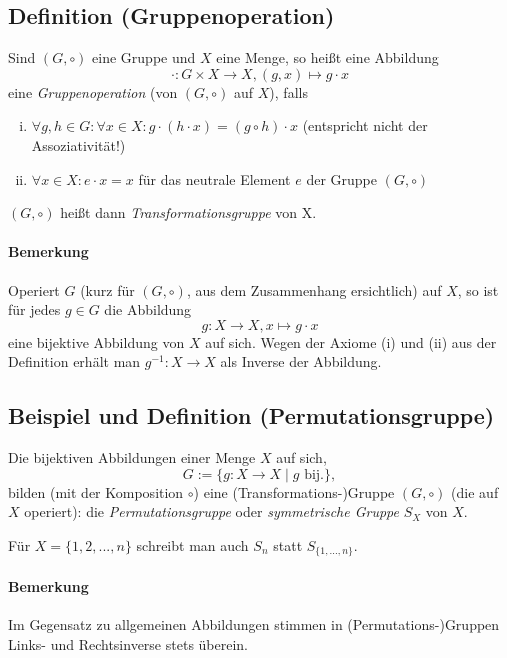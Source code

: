 \subsection{Definition (Gruppenoperation)}
	\begin{Definition}[Gruppenoperation]
		Sind $(G,\circ )$ eine Gruppe und $X$ eine Menge, so heißt eine Abbildung
		\[ \cdot : G\times X\to X, (g,x)\mapsto g\cdot x \]
	eine \emph{Gruppenoperation} (von $(G,\circ )$ auf $X$), falls
	\begin{enumerate}[(i)]
		\item $\forall g,h\in G :\forall x\in X: g\cdot (h\cdot x) = (g\circ h)\cdot x$ (entspricht nicht der Assoziativität!)
		\item $\forall x\in X: e\cdot x = x$ für das neutrale Element $e$ der Gruppe $(G,\circ )$
	\end{enumerate}
	$(G,\circ )$ heißt dann \emph{Transformationsgruppe} von X.
	\end{Definition}

\paragraph{Bemerkung}
	Operiert $G$ (kurz für $(G,\circ )$, aus dem Zusammenhang ersichtlich) auf $X$, so ist für jedes $g\in G$ die Abbildung
		\[ g:X\to X, x\mapsto g\cdot x \]
	eine bijektive Abbildung von $X$ auf sich. Wegen der Axiome (i) und (ii) aus der Definition erhält man $g^{-1}: X\to X$ als Inverse der Abbildung.
	
\subsection{Beispiel und Definition (Permutationsgruppe)}
	\begin{Definition}[Permutationsgruppe]
		Die bijektiven Abbildungen einer Menge $X$ auf sich, 
		\[ G:= \{g:X\to X\mid g \text{ bij.}\}, \]
	bilden (mit der Komposition $\circ$) eine (Transformations-)Gruppe $(G,\circ )$ (die auf $X$ operiert): die \emph{Permutationsgruppe} oder \emph{symmetrische Gruppe} $S_X$ von $X$.
	
	Für $X=\{1,2,...,n\}$ schreibt man auch $S_n$ statt $S_{\{1,...,n\}}$.
	\end{Definition}
\paragraph{Bemerkung}
	Im Gegensatz zu allgemeinen Abbildungen stimmen in (Permutations-)Gruppen Links- und Rechtsinverse stets überein.
